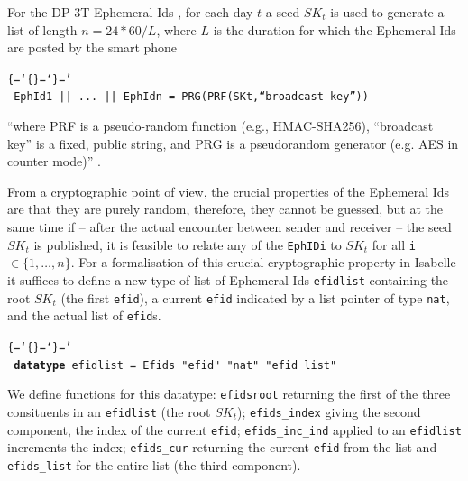 \documentclass{llncs}
\newenvironment{ttbox}{\begin{alltt}\ttbraces\small\tt}%
                      {\end{alltt}}
\def\ttbraces{\let\.=\nobreak\chardef\{=`\{\chardef\}=`\}\chardef\|=`\\}
\begin{document}
For the DP-3T Ephemeral Ids \cite{dp3t:wp}, for each day $t$ a seed $SK_t$
is used to generate a list of length $n = 24 * 60 / L$, where $L$ is the duration for which
the Ephemeral Ids are posted by the smart phone
\begin{ttbox}
  EphId1 || ... || EphIdn = PRG(PRF(SKt,``broadcast key''))
\end{ttbox} 
``where PRF is a pseudo-random function (e.g., HMAC-SHA256), ``broadcast key'' is a
fixed, public string, and PRG is a pseudorandom generator (e.g. AES in counter mode)'' \cite{dp3t:wp}.

From a cryptographic point of view, the crucial properties of the Ephemeral Ids are that
they are purely random, therefore, they cannot be guessed, but at the same time if -- after
the actual encounter between sender and receiver -- the seed $SK_t$ is published, it is feasible
to relate any of the \texttt{EphIDi} to $SK_t$  for all \texttt{i} $\in \{1, \ldots, n\}$.
For a formalisation of this crucial cryptographic property in Isabelle it suffices to define a new type
of list of Ephemeral Ids \texttt{efidlist} containing the root $SK_t$ (the first \texttt{efid}),
a current \texttt{efid} indicated by a list pointer of type \texttt{nat}, and the actual list of
\texttt{efid}s.
\begin{ttbox}
{\bf{datatype}} efidlist = Efids "efid" "nat" "efid list"
\end{ttbox}
We define functions for this datatype: \texttt{efidsroot} returning the first of the three
consituents in an \texttt{efidlist} (the root $SK_t$); \texttt{efids\_index} giving the second
component, the index of the current \texttt{efid}; \texttt{efids\_inc\_ind} applied to an
\texttt{efidlist} increments the index; \texttt{efids\_cur} returning the current \texttt{efid}
from the list and \texttt{efids\_list} for the entire list (the third component).
\end{document}
